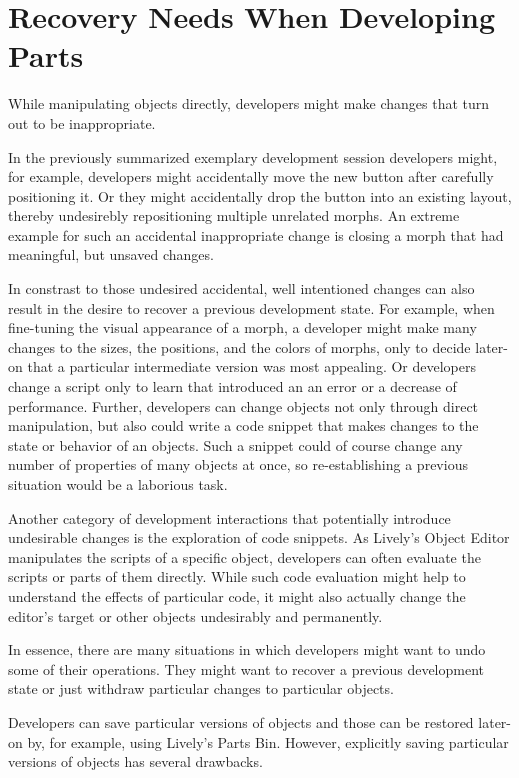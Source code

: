 


\section{Recovery Needs When Developing Parts}

While manipulating objects directly, developers might make changes that turn out to be inappropriate.

In the previously summarized exemplary development session developers might, for example, developers might accidentally move the new button after carefully positioning it.
Or they might accidentally drop the button into an existing layout, thereby undesirebly repositioning multiple unrelated morphs.
An extreme example for such an accidental inappropriate change is closing a morph that had meaningful, but unsaved changes.

In constrast to those undesired accidental, well intentioned changes can also result in the desire to recover a previous development state.
For example, when fine-tuning the visual appearance of a morph, a developer might make many changes to the sizes, the positions, and the colors of morphs, only to decide later-on that a particular intermediate version was most appealing.
Or developers change a script only to learn that introduced an an error or a decrease of performance.
Further, developers can change objects not only through direct manipulation, but also could write a code snippet that makes changes to the state or behavior of an objects.
Such a snippet could of course change any number of properties of many objects at once, so re-establishing a previous situation would be a laborious task.

Another category of development interactions that potentially introduce undesirable changes is the exploration of code snippets.
As Lively's Object Editor manipulates the scripts of a specific object, developers can often evaluate the scripts or parts of them directly.
While such code evaluation might help to understand the effects of particular code, it might also actually change the editor's target or other objects undesirably and permanently.

In essence, there are many situations in which developers might want to undo some of their operations.
They might want to recover a previous development state or just withdraw particular changes to particular objects.

Developers can save particular versions of objects and those can be restored later-on by, for example, using Lively's Parts Bin.
However, explicitly saving particular versions of objects has several drawbacks.


